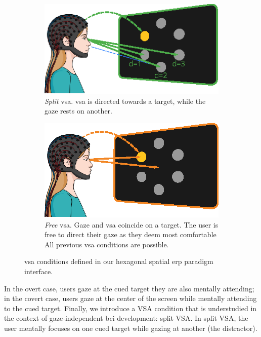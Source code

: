 \begin{figure}
  \begin{subfigure}{.45\textwidth}
    \includegraphics[width=\textwidth]{figures/gaze_independence/attention_split.eps}
    \caption[Split \ac{vsa}]{%
      \emph{Split} \ac{vsa}.
      \Ac{vsa} is directed towards a target, while the gaze rests on another.
    }
    \label{fig:gaze/vsa/overt}
  \end{subfigure}\hfill%
   \begin{subfigure}{.45\textwidth}
    \includegraphics[width=\textwidth]{figures/gaze_independence/attention_free.eps}
    \caption[Free \ac{vsa}]{%
      \emph{Free} \ac{vsa}.
      Gaze and \ac{vsa} coincide on a target.
      The user is free to direct their gaze as they deem most comfortable
      All previous \ac{vsa} conditions are possible.
    }
    \label{fig:gaze/vsa/overt}
  \end{subfigure}\hfill%
  \caption[\Ac{vsa} conditions]{%
    \Ac{vsa} conditions defined in our hexagonal spatial \ac{erp} paradigm interface.
  }
  \label{fig:gaze-vsa}
\end{figure}
In the overt case, users gaze at the cued
target they are also mentally attending; in the covert case, users
gaze at the center of the screen while mentally attending to the cued target.
Finally, we introduce a VSA condition that is understudied in the context of
gaze-independent \ac{bci} development: split VSA.
In split VSA, the user mentally focuses on one cued target while gazing at
another (the distractor).


